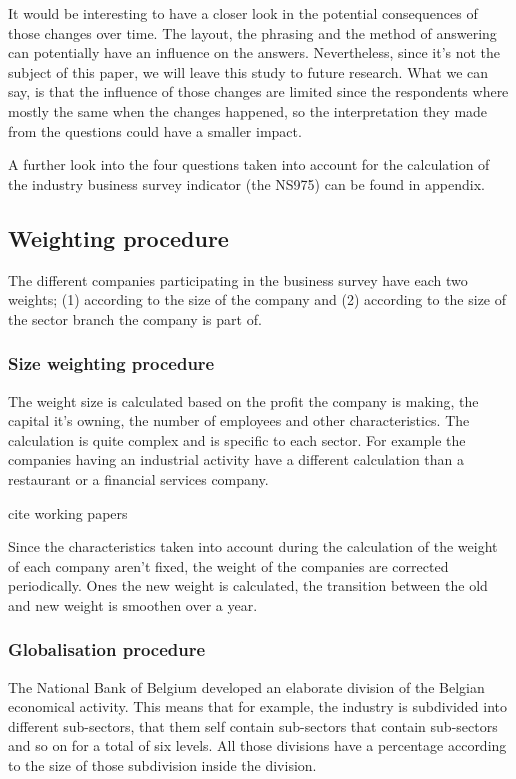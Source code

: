 \documentclass[12pt,a4paper,oneside]{book}
\begin{document}
It would be interesting to have a closer look in the potential consequences of those changes over time. The layout, the phrasing and the method of answering can potentially have an influence on the answers. Nevertheless, since it's not the subject of this paper, we will leave this study to future research.
What we can say, is that the influence of those changes are limited since the respondents where mostly the same when the changes happened, so the interpretation they made from the questions could have a smaller impact.

A further look into the four questions taken into account for the calculation of the industry business survey indicator (the NS975) can be found in appendix.


\subsection{Weighting procedure}
\label{sec:Weighting procedure}

The different companies participating in the business survey have each two weights; (1) according to the size of the company and (2) according to the size of the sector branch the company is part of.

\subsubsection{Size weighting procedure}

The weight size is calculated based on the profit the company is making, the capital it's owning, the number of employees and other characteristics. 
The calculation is quite complex and is specific to each sector. 
For example the companies having an industrial activity have a different calculation than a restaurant or a financial services company.

cite working papers

Since the characteristics taken into account during the calculation of the weight of each company aren't fixed, the weight of the companies are corrected periodically. 
Ones the new weight is calculated, the transition between the old and new weight is smoothen over a year.

\subsubsection{Globalisation procedure}

The National Bank of Belgium developed an elaborate division of the Belgian economical activity. This means that for example, the industry is subdivided into different sub-sectors, that them self contain sub-sectors that contain sub-sectors and so on for a total of six levels. 
All those divisions have a percentage according to the size of those subdivision inside the division.
\end{document}
